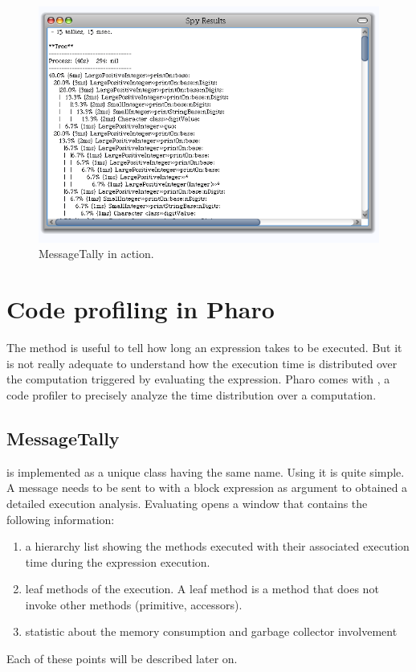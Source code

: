 \documentclass[a4paper,10pt,twoside]{book}
\begin{document}
\begin{figure}
	\begin{center}
	\includegraphics[width=.8\linewidth]{MessageTallyOne}
	\caption{MessageTally in action.}
	\end{center}
\end{figure}


\section{Code profiling in Pharo} 

The  method is useful to tell how long an expression takes to be executed. But it is not really adequate to understand how the execution time is distributed over the computation triggered by evaluating the expression. Pharo comes with , a code profiler to precisely analyze the time distribution over a computation. 


\subsection{MessageTally}
 is implemented as a unique class having the same name. Using it is quite simple. A message  needs to be sent to  with a block expression as argument to obtained a detailed execution analysis. Evaluating  opens a window that contains the following information:

\begin{enumerate}
\item a hierarchy list showing the methods executed with their associated execution time during the expression execution.

\item leaf methods of the execution. A leaf method is a method that does not invoke other methods (\eg primitive, accessors). 

\item statistic about the memory consumption and garbage collector involvement 

\end{enumerate}
Each of these points will be described later on.
\end{document}
